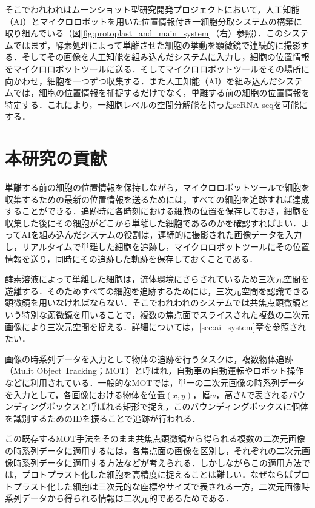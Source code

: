 そこでわれわれはムーンショット型研究開発プロジェクトにおいて，人工知能（AI）とマイクロロボットを用いた位置情報付き一細胞分取システムの構築に取り組んでいる（図\ref{fig:protoplast_and_main_system}（右）参照）．このシステムではまず，酵素処理によって単離させた細胞の挙動を顕微鏡で連続的に撮影する．そしてその画像を人工知能を組み込んだシステムに入力し，細胞の位置情報をマイクロロボットツールに送る．そしてマイクロロボットツールをその場所に向かわせ，細胞を一つずつ収集する．また人工知能（AI）を組み込んだシステムでは，細胞の位置情報を捕捉するだけでなく，単離する前の細胞の位置情報を特定する．これにより，一細胞レベルの空間分解能を持ったscRNA-seqを可能にする．

\section{本研究の貢献}
\label{sec:contribution}

単離する前の細胞の位置情報を保持しながら，マイクロロボットツールで細胞を収集するための最新の位置情報を送るためには，すべての細胞を追跡すれば達成することができる．追跡時に各時刻における細胞の位置を保存しておき，細胞を収集した後にその細胞がどこから単離した細胞であるのかを確認すればよい．よってAIを組み込んだシステムの役割は，連続的に撮影された画像データを入力し，リアルタイムで単離した細胞を追跡し，マイクロロボットツールにその位置情報を送り，同時にその追跡した軌跡を保存しておくことである．

酵素溶液によって単離した細胞は，流体環境にさらされているため三次元空間を遊離する．そのためすべての細胞を追跡するためには，三次元空間を認識できる顕微鏡を用いなければならない．そこでわれわれのシステムでは共焦点顕微鏡という特別な顕微鏡を用いることで，複数の焦点面でスライスされた複数の二次元画像により三次元空間を捉える．詳細については，\ref{sec:ai_system}章を参照されたい．

画像の時系列データを入力として物体の追跡を行うタスクは，複数物体追跡（Mulit Object Tracking；MOT）と呼ばれ，自動車の自動運転やロボット操作などに利用されている．一般的なMOTでは，単一の二次元画像の時系列データを入力として，各画像における物体を位置$(x, y)$，幅$w$，高さ$h$で表されるバウンディングボックスと呼ばれる矩形で捉え，このバウンディングボックスに個体を識別するためのIDを振ることで追跡が行われる．

この既存するMOT手法をそのまま共焦点顕微鏡から得られる複数の二次元画像の時系列データに適用するには，各焦点面の画像を区別し，それぞれの二次元画像時系列データに適用する方法などが考えられる．しかしながらこの適用方法では，プロトプラスト化した細胞を高精度に捉えることは難しい．なぜならばプロトプラスト化した細胞は三次元的な座標やサイズで表される一方，二次元画像時系列データから得られる情報は二次元的であるためである．

